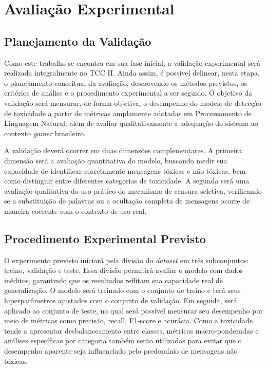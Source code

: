 \documentclass{eic-bcc-tcc}
\begin{document}
\chapter{Avaliação Experimental}
\label{cha:avaliacao}

\section{Planejamento da Validação}

Como este trabalho se encontra em sua fase inicial, a validação experimental será realizada integralmente no TCC II. Ainda assim, é possível delinear, nesta etapa, o planejamento conceitual da avaliação, descrevendo os métodos previstos, os critérios de análise e o procedimento experimental a ser seguido. O objetivo da validação será mensurar, de forma objetiva, o desempenho do modelo de detecção de toxicidade a partir de métricas amplamente adotadas em Processamento de Linguagem Natural, além de avaliar qualitativamente a adequação do sistema ao contexto \textit{gamer} brasileiro.

A validação deverá ocorrer em duas dimensões complementares. A primeira dimensão será a avaliação quantitativa do modelo, buscando medir sua capacidade de identificar corretamente mensagens tóxicas e não tóxicas, bem como distinguir entre diferentes categorias de toxicidade. A segunda será uma avaliação qualitativa do uso prático do mecanismo de censura seletiva, verificando se a substituição de palavras ou a ocultação completa de mensagens ocorre de maneira coerente com o contexto de uso real.

\section{Procedimento Experimental Previsto}

O experimento previsto iniciará pela divisão do \textit{dataset} em três subconjuntos: treino, validação e teste. Essa divisão permitirá avaliar o modelo com dados inéditos, garantindo que os resultados reflitam sua capacidade real de generalização. O modelo será treinado com o conjunto de treino e terá seus hiperparâmetros ajustados com o conjunto de validação. Em seguida, será aplicado ao conjunto de teste, no qual será possível mensurar seu desempenho por meio de métricas como precisão, recall, F1-score e acurácia. Como a toxicidade tende a apresentar desbalanceamento entre classes, métricas macro-ponderadas e análises específicas por categoria também serão utilizadas para evitar que o desempenho aparente seja influenciado pelo predomínio de mensagens não tóxicas.
\end{document}
